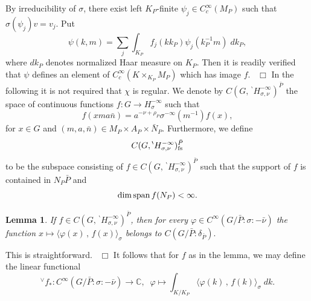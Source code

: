 \documentclass[12pt,a4paper]{article}
\newtheorem{Lemma}[Thm]{Lemma}
\newenvironment{lemma}[0]{\begin{Lemma}\noindent}%
{\end{Lemma}}
\def\proof{\par\noindent{\it Proof.}{\ }{\ }}
\def\qed{~\hfill\hbox{$\Box$}\medbreak}
\def\msy#1{{\mathbb #1}}
\def\C{{\msy C}}
\def\gd{\delta}
\def\gf{\varphi}
\def\gs{\sigma}
\def\to{\rightarrow}
\def\inp#1#2{\langle#1\,,\,#2\rangle}
\numberwithin{Thm}{section}
\numberwithin{equation}{section}
\numberwithin{equation}{section}
\def\bp{\!{\,}^\backprime}
\def\fds{{\rm fs}}
\def\cchi{\chi}
\def\veec{\vee}%
\def\trw{{}^{\scriptscriptstyle\veec}}
\begin{document}
By irreducibility of $\gs$, there exist left $K_P$-finite $\psi_j \in C_c^\infty(M_P)$ 
such that $\gs(\psi_j) v = v_j.$ Put 
$$ 
\psi (k, m) = \sum_j \int_{K_P} f_j(k k_P) \psi_j(k_P^{-1} m)\; dk_P,
$$%
where $dk_P$ denotes normalized Haar measure on $K_P.$ 
Then it is readily verified that $\psi$ defines an element of 
$C^\infty_c(K \times_{K_P} M_P)$ which has image $f.$ 
\qed
In the following it is not required that $\cchi$ is regular.  
We denote by $C(G, \bp H_{\gs, \nu}^{-\infty})^{\bar P}$ the space
of continuous functions $f: G \to H_\gs^{-\infty}$ such that 
$$ 
f(x ma\bar n) = a^{-\nu + \rho_P} \gs^{-\infty}(m^{-1}) f(x), 
$$ 
for $x \in G$ and $(m,a,\bar n) \in M_P \times A_P\times \bar N_P.$ 
Furthermore, we define
\begin{equation}
\label{e: defi C fs} 
C(G, \bp H_{\gs, \nu}^{-\infty})^{\bar P}_{\fds}
\end{equation}
to be the subspace consisting of 
$f\in C(G, \bp H_{\gs, \nu}^{-\infty})^{\bar P}
$
such that the support of $f$ is contained in $N_P\bar P$ and 
$$ 
\dim {\rm span}\, f(N_P) < \infty.
$$ 
 \begin{lemma} 
 \label{l: continuity f gf}
 If $f \in C(G, \bp H_{\gs, \nu}^{-\infty})^{\bar P}$, then 
 for every $\gf \in C^\infty(G/\bar P: \gs: - \bar \nu)$ the function $x \mapsto \inp{\gf(x)}{f(x)}_{\gs}$ 
 belongs to $C(G/\bar P : \gd_{\bar P}).$
 \end{lemma}
 
 \proof
 This is straightforward.
 \qed
 It follows that for $f$ as in the lemma, we may define the linear functional 
 $$
 \trw\!f_*: C^\infty(G/\bar P: \gs:-\bar \nu) \to \C, \;\; \gf \mapsto \int_{K/K_P} \inp{\gf(k)}{f(k)}_{\gs} \; dk .
 $$ 
 
\end{document}
